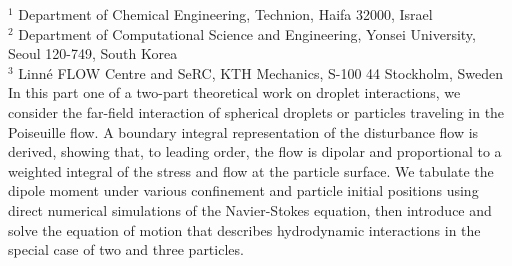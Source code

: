 %
%
%
%
%
%
%
\paperaffiliation
{%
  $^1$ Department of Chemical Engineering, Technion, Haifa 32000, Israel\\%
  $^2$ Department of Computational Science and Engineering, Yonsei University, \\Seoul 120-749, South Korea\\%
  $^3$ Linn\'e FLOW Centre and SeRC, KTH Mechanics, S-100 44 Stockholm, Sweden%
}%
%
%
%
%
%
%
\paperpages{}%
%
%
%
\papersummary%
{%
   In this part one of a two-part theoretical work on droplet interactions,
   we consider the far-field interaction of spherical droplets or particles traveling in the Poiseuille flow.
   A boundary integral representation of the disturbance flow is derived,
   showing that, to leading order, the flow is dipolar and proportional to a weighted integral of the stress and flow at the particle surface.
   We tabulate the dipole moment under various confinement and particle initial positions using direct numerical simulations of the Navier-Stokes equation,
   then introduce and solve the equation of motion that describes hydrodynamic interactions in the special case of two and three particles. 
}%
%
\graphicspath{{paper3/}}%
%
%
%
